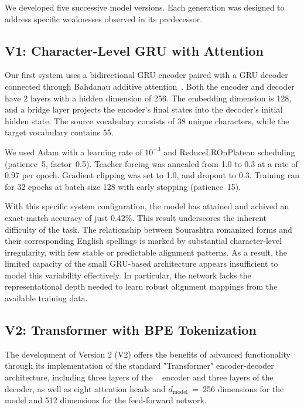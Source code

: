 \documentclass[conference]{IEEEtran}
\begin{document}
We developed five successive model versions. Each generation was designed to address specific weaknesses observed in its predecessor.

\subsection{V1: Character-Level GRU with Attention}

Our first system uses a bidirectional GRU encoder paired with a GRU decoder connected through Bahdanau additive attention~\cite{bahdanau2015attention}. Both the encoder and decoder have 2 layers with a hidden dimension of 256. The embedding dimension is 128, and a bridge layer projects the encoder's final states into the decoder's initial hidden state. The source vocabulary consists of 38 unique characters, while the target vocabulary contains 55.

We used Adam with a learning rate of $10^{-3}$ and ReduceLROnPlateau scheduling (patience~5, factor~0.5). Teacher forcing was annealed from 1.0 to 0.3 at a rate of 0.97 per epoch. Gradient clipping was set to 1.0, and dropout to 0.3. Training ran for 32 epochs at batch size 128 with early stopping (patience~15).

With this specific system configuration, the model has attained and achived an exact-match accuracy of just 0.42\%. This result underscores the inherent difficulty of the task. The relationship between Sourashtra romanized forms and their corresponding English spellings is marked by substantial character-level irregularity, with few stable or predictable alignment patterns. As a result, the limited capacity of the small GRU-based architecture appears insufficient to model this variability effectively. In particular, the network lacks the representational depth needed to learn robust alignment mappings from the available training data.

\subsection{V2: Transformer with BPE Tokenization}

The development of Version 2 (V2) offers the benefits of advanced functionality through its implementation of the standard "Transformer" encoder-decoder architecture, including three layers of the ~\cite{vaswani2017attention} encoder and three layers of the decoder, as well as eight attention heads and $d_\text{model}$~=~256  dimensions for the model and 512 dimensions for the feed-forward network.
\end{document}

